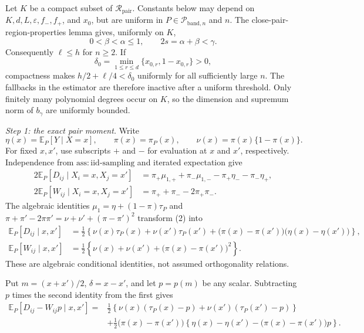 Let \(K\) be a compact subset of \(\mathcal R_{\mathrm{pair}}\).  Constants
below may depend on \(K,d,L,\varepsilon,f_{-},f_{+}\), and \(x_0\), but are
uniform in \(P\in\mathcal P_{\mathrm{band},n}\) and \(n\).  The
close-pair-region-properties lemma gives, uniformly on \(K\),
\[
0<\beta<\alpha\leq1,
\qquad 2s=\alpha+\beta<\gamma.
\tag{1}
\]
Consequently \(\ell\leq h\) for \(n\geq2\).  If
\[
\delta_0=\min_{1\leq r\leq d}\{x_{0,r},1-x_{0,r}\}>0,
\]
compactness makes \(h/2+\ell/4<\delta_0\) uniformly for all sufficiently
large \(n\).  The fallbacks in the estimator are therefore inactive after a
uniform threshold.  Only finitely many polynomial degrees occur on \(K\), so
the dimension and supremum norm of \(b_\gamma\) are uniformly bounded.

\emph{Step 1: the exact pair moment.}
Write
\[
\eta(x)=\mathbb E_P[Y\mid X=x],
\qquad \pi(x)=\pi_P(x),
\qquad \nu(x)=\pi(x)\{1-\pi(x)\}.
\]
For fixed \(x,x'\), use subscripts \(+\) and \(-\) for evaluation at
\(x\) and \(x'\), respectively.  Independence from
\(\mathrm{ass:iid\mbox{-}sampling}\) and iterated expectation give
\[
\begin{aligned}
2\mathbb E_P[D_{ij}\mid X_i=x,X_j=x']
&=\pi_+\mu_{1,+}+\pi_-\mu_{1,-}
-\pi_+\eta_- -\pi_-\eta_+,\\
2\mathbb E_P[W_{ij}\mid X_i=x,X_j=x']
&=\pi_++\pi_- -2\pi_+\pi_-.
\end{aligned}
\tag{2}
\]
The algebraic identities
\(\mu_1=\eta+(1-\pi)\tau_P\) and
\(\pi+\pi'-2\pi\pi'=\nu+\nu'+(\pi-\pi')^2\) transform (2) into
\[
\begin{aligned}
\mathbb E_P[D_{ij}\mid x,x']
&=\frac12\left\{
\nu(x)\tau_P(x)+\nu(x')\tau_P(x')
+\bigl(\pi(x)-\pi(x')\bigr)
\bigl(\eta(x)-\eta(x')\bigr)
\right\},\\
\mathbb E_P[W_{ij}\mid x,x']
&=\frac12\left\{
\nu(x)+\nu(x')+\bigl(\pi(x)-\pi(x')\bigr)^2
\right\}.
\end{aligned}
\tag{3}
\]
These are algebraic conditional identities, not assumed orthogonality
relations.

Put \(m=(x+x')/2\), \(\delta=x-x'\), and let \(p=p(m)\) be any scalar.
Subtracting \(p\) times the second identity from the first gives
\[
\begin{aligned}
\mathbb E_P[D_{ij}-W_{ij}p\mid x,x']
={}&\frac12\left\{
\nu(x)(\tau_P(x)-p)+\nu(x')(\tau_P(x')-p)
\right\}\\
&+\frac12\bigl(\pi(x)-\pi(x')\bigr)
\left\{
\eta(x)-\eta(x')-\bigl(\pi(x)-\pi(x')\bigr)p
\right\}.
\end{aligned}
\tag{4}
\]

